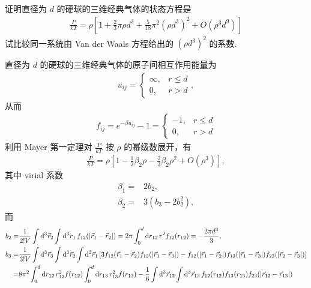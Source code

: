\documentclass{assignment}
\begin{document}
\begin{prob}
    证明直径为 $d$ 的硬球的三维经典气体的状态方程是
    \begin{align}
        \frac{P}{kT}=\rho\left[1+\frac{2}{3}\pi\rho d^3+\frac{5}{18}\pi^2(\rho d^3)^2+O(\rho^3d^9)\right]
    \end{align}
    试比较同一系统由 Van der Waals 方程给出的 $(\rho d^3)^2$ 的系数.
\end{prob}
\begin{pf}
    直径为 $d$ 的硬球的三维经典气体的原子间相互作用能量为
    \begin{align}
        u_{ij}=\left\{\begin{array}{ll}
            \infty,&r\leq d\\
            0,&r>d
        \end{array}\right.,
    \end{align}
    从而
    \begin{align}
        f_{ij}=e^{-\beta u_{ij}}-1=\left\{\begin{array}{ll}
            -1,&r\leq d\\
            0,&r>d
        \end{array}\right.
    \end{align}
    利用 Mayer 第一定理对 $\frac{P}{kT}$ 按 $\rho$ 的幂级数展开，有
    \begin{align}
        \frac{P}{kT}=\rho\left[1-\frac{1}{2}\beta_2\rho-\frac{2}{3}\beta_2\rho^2+O(\rho^3)\right],
    \end{align}
    其中 virial 系数
    \begin{align}
        \beta_1=&2b_2,\\
        \beta_2=&3(b_3-2b_2^2),
    \end{align}
    而
    \begin{align}
        b_2=&\frac{1}{2!V}\int\mathrm{d}^3\vec{r}_2\int\mathrm{d}^3r_1\,f_{12}(\abs{\vec{r}_1-\vec{r}_2})=2\pi\int_0^d\mathrm{d}r_{12}\,r^2f_{12}(r_{12})=-\frac{2\pi d^3}{3},\\
        \notag b_3=&\frac{1}{3!V}\int\mathrm{d}^3\vec{r}_3\int\mathrm{d}^3\vec{r}_2\int\mathrm{d}^3\vec{r}_1\,[3f_{12}(\vec{r}_1-\vec{r}_2)f_{13}(\abs{\vec{r}_1-\vec{r}_3})-f_{12}(\abs{\vec{r}_1-\vec{r}_2})f_{13}(\abs{\vec{r}_1-\vec{r}_3})f_{23}(\abs{\vec{r}_2-\vec{r}_3})]\\
        \notag=&8\pi^2\int_0^d\mathrm{d}r_{12}\,r_{12}^2f(r_{12})\int_0^d\mathrm{d}r_{13}\,r_{13}^2f(r_{13})-\frac{1}{6}\int\mathrm{d}^3\vec{r}_{12}\int\mathrm{d}^3\vec{r}_{13}\,f_{12}(r_{12})f_{13}(r_{13})f_{23}(\abs{\vec{r}_{12}-\vec{r}_{13}})\\

\end{align}
\end{pf}
\end{document}
